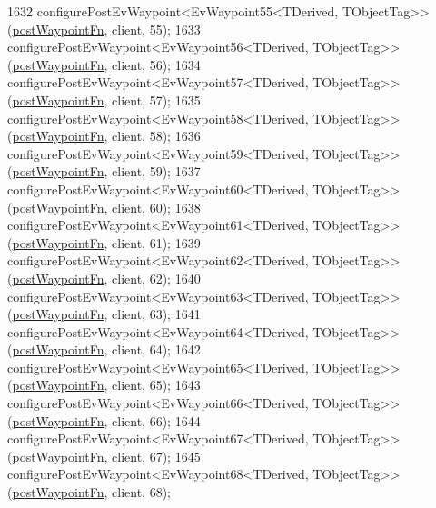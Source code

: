 \begin{DoxyCode}
1632     configurePostEvWaypoint<EvWaypoint55<TDerived, TObjectTag>>(\hyperlink{classmove__base__z__client_1_1WaypointEventDispatcher_acc538eb7506c13f7cca2268a1742dadd}{postWaypointFn}, client, 55);
1633     configurePostEvWaypoint<EvWaypoint56<TDerived, TObjectTag>>(\hyperlink{classmove__base__z__client_1_1WaypointEventDispatcher_acc538eb7506c13f7cca2268a1742dadd}{postWaypointFn}, client, 56);
1634     configurePostEvWaypoint<EvWaypoint57<TDerived, TObjectTag>>(\hyperlink{classmove__base__z__client_1_1WaypointEventDispatcher_acc538eb7506c13f7cca2268a1742dadd}{postWaypointFn}, client, 57);
1635     configurePostEvWaypoint<EvWaypoint58<TDerived, TObjectTag>>(\hyperlink{classmove__base__z__client_1_1WaypointEventDispatcher_acc538eb7506c13f7cca2268a1742dadd}{postWaypointFn}, client, 58);
1636     configurePostEvWaypoint<EvWaypoint59<TDerived, TObjectTag>>(\hyperlink{classmove__base__z__client_1_1WaypointEventDispatcher_acc538eb7506c13f7cca2268a1742dadd}{postWaypointFn}, client, 59);
1637     configurePostEvWaypoint<EvWaypoint60<TDerived, TObjectTag>>(\hyperlink{classmove__base__z__client_1_1WaypointEventDispatcher_acc538eb7506c13f7cca2268a1742dadd}{postWaypointFn}, client, 60);
1638     configurePostEvWaypoint<EvWaypoint61<TDerived, TObjectTag>>(\hyperlink{classmove__base__z__client_1_1WaypointEventDispatcher_acc538eb7506c13f7cca2268a1742dadd}{postWaypointFn}, client, 61);
1639     configurePostEvWaypoint<EvWaypoint62<TDerived, TObjectTag>>(\hyperlink{classmove__base__z__client_1_1WaypointEventDispatcher_acc538eb7506c13f7cca2268a1742dadd}{postWaypointFn}, client, 62);
1640     configurePostEvWaypoint<EvWaypoint63<TDerived, TObjectTag>>(\hyperlink{classmove__base__z__client_1_1WaypointEventDispatcher_acc538eb7506c13f7cca2268a1742dadd}{postWaypointFn}, client, 63);
1641     configurePostEvWaypoint<EvWaypoint64<TDerived, TObjectTag>>(\hyperlink{classmove__base__z__client_1_1WaypointEventDispatcher_acc538eb7506c13f7cca2268a1742dadd}{postWaypointFn}, client, 64);
1642     configurePostEvWaypoint<EvWaypoint65<TDerived, TObjectTag>>(\hyperlink{classmove__base__z__client_1_1WaypointEventDispatcher_acc538eb7506c13f7cca2268a1742dadd}{postWaypointFn}, client, 65);
1643     configurePostEvWaypoint<EvWaypoint66<TDerived, TObjectTag>>(\hyperlink{classmove__base__z__client_1_1WaypointEventDispatcher_acc538eb7506c13f7cca2268a1742dadd}{postWaypointFn}, client, 66);
1644     configurePostEvWaypoint<EvWaypoint67<TDerived, TObjectTag>>(\hyperlink{classmove__base__z__client_1_1WaypointEventDispatcher_acc538eb7506c13f7cca2268a1742dadd}{postWaypointFn}, client, 67);
1645     configurePostEvWaypoint<EvWaypoint68<TDerived, TObjectTag>>(\hyperlink{classmove__base__z__client_1_1WaypointEventDispatcher_acc538eb7506c13f7cca2268a1742dadd}{postWaypointFn}, client, 68);

\end{DoxyCode}
